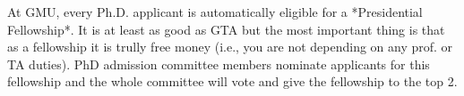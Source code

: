 \documentclass[10pt]{article}
\begin{document}
\begin{tcolorbox}[left=1pt,right=1pt,top=1pt,bottom=1pt]
At GMU, every Ph.D. applicant is automatically eligible for a *Presidential Fellowship*.  It is at least as good as GTA but the most important thing is that as a fellowship it is trully free money (i.e., you are not depending on any prof. or TA duties).  PhD admission committee members nominate applicants for this fellowship and the whole committee will vote and give the fellowship to the top 2.
\end{tcolorbox}





\newpage
\end{document}
